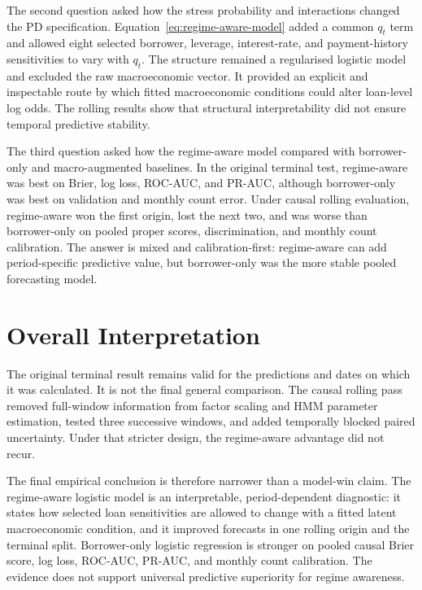 The second question asked how the stress probability and interactions changed the PD specification. Equation~\eqref{eq:regime-aware-model} added a common $q_t$ term and allowed eight selected borrower, leverage, interest-rate, and payment-history sensitivities to vary with $q_t$. The structure remained a regularised logistic model and excluded the raw macroeconomic vector. It provided an explicit and inspectable route by which fitted macroeconomic conditions could alter loan-level log odds. The rolling results show that structural interpretability did not ensure temporal predictive stability.

The third question asked how the regime-aware model compared with borrower-only and macro-augmented baselines. In the original terminal test, regime-aware was best on Brier, log loss, ROC-AUC, and PR-AUC, although borrower-only was best on validation and monthly count error. Under causal rolling evaluation, regime-aware won the first origin, lost the next two, and was worse than borrower-only on pooled proper scores, discrimination, and monthly count calibration. The answer is mixed and calibration-first: regime-aware can add period-specific predictive value, but borrower-only was the more stable pooled forecasting model.

\section{Overall Interpretation}

The original terminal result remains valid for the predictions and dates on which it was calculated. It is not the final general comparison. The causal rolling pass removed full-window information from factor scaling and HMM parameter estimation, tested three successive windows, and added temporally blocked paired uncertainty. Under that stricter design, the regime-aware advantage did not recur.

The final empirical conclusion is therefore narrower than a model-win claim. The regime-aware logistic model is an interpretable, period-dependent diagnostic: it states how selected loan sensitivities are allowed to change with a fitted latent macroeconomic condition, and it improved forecasts in one rolling origin and the terminal split. Borrower-only logistic regression is stronger on pooled causal Brier score, log loss, ROC-AUC, PR-AUC, and monthly count calibration. The evidence does not support universal predictive superiority for regime awareness.

